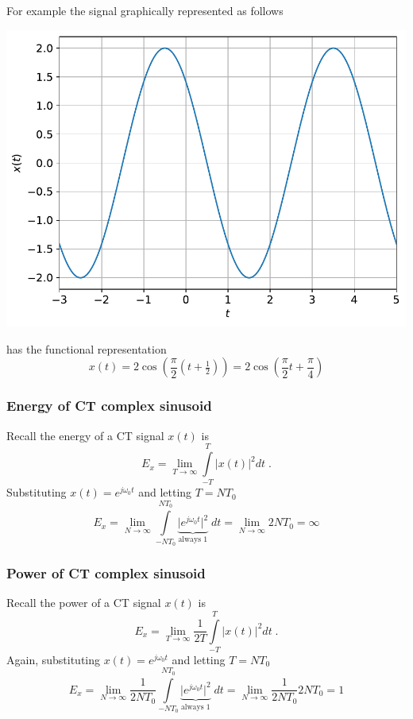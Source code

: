 For example the signal graphically represented as follows
\begin{center}
  \includegraphics[scale=0.6]{graphics/ctsinusoid.pdf}
\end{center}
has the functional representation
\[
x(t) = 2\cos\left(\frac{\pi}{2} (t+\tfrac{1}{2}) \right) =  2\cos\left(\frac{\pi}{2} t +\frac{\pi}{4} \right)
\]

\subsubsection{Energy of CT complex sinusoid}

Recall the energy of a CT signal $x(t)$ is    
\[
  E_x = \lim_{T\rightarrow\infty} \int\limits_{-T}^T \lvert x(t) \rvert^2 dt \; .
\]
Substituting $x(t) = e^{j\omega_0 t}$ and letting $T = N T_0$
  \[
    E_x = \lim_{N\rightarrow\infty} \int\limits_{-N T_0}^{N T_0} \underbrace{\lvert e^{j\omega_0 t} \rvert^2}_{\text{always 1}} \; dt = \lim_{N\rightarrow\infty} 2NT_0 = \infty
  \]

\subsubsection{Power of CT complex sinusoid}

Recall the power of a CT signal $x(t)$ is
\[
  E_x = \lim_{T\rightarrow\infty} \frac{1}{2T} \int\limits_{-T}^T \lvert x(t) \rvert^2 dt \; .
\]
Again, substituting $x(t) = e^{j\omega_0 t}$ and letting $T = N T_0$
\[
  E_x = \lim_{N\rightarrow\infty} \frac{1}{2NT_0} \int\limits_{-N T_0}^{N T_0} \underbrace{\lvert e^{j\omega_0 t} \rvert^2}_{\text{always 1}} \; dt = \lim_{N\rightarrow\infty} \frac{1}{2NT_0} 2NT_0 = 1
\]
  
